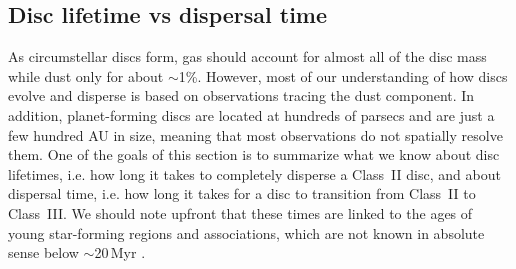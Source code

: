 \documentclass{rsos}
\begin{document}
\subsection{Disc lifetime vs dispersal time}\label{sect:disc_clearing}
As circumstellar discs form, gas should account for almost all of the disc mass while dust only for about $\sim$1\%. However, most of our understanding of how discs evolve and disperse is based on observations tracing the dust component. 
In addition, planet-forming discs are located at hundreds of parsecs and are just a few hundred AU in size, meaning that most observations do not spatially resolve them. One of the goals of this section is to summarize what we know about disc lifetimes, i.e. how long it takes to completely disperse a Class~II disc, and about dispersal time, i.e. how long it takes for a disc to transition from Class~II to Class~III. We should note upfront that these times are linked to the ages of young  star-forming regions and associations,  which are not known in absolute sense below $\sim$20\,Myr 
\cite{2014prpl.conf..219S}.
\end{document}

